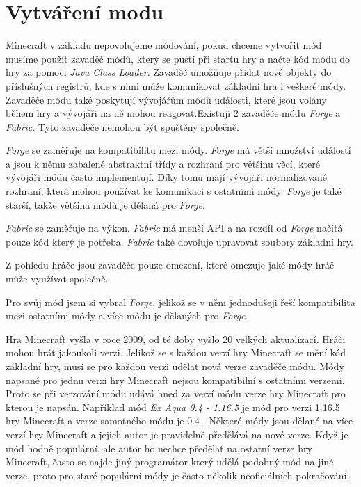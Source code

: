 \documentclass[FM,Proj,bw]{tulthesis}
\begin{document}
\chapter{Vytváření modu}
    Minecraft v základu nepovolujeme módování, pokud chceme vytvořit mód musíme použít zavaděč módů, který se pustí při startu hry a načte kód módu do hry za pomoci \textit{Java Class Loader}. Zavaděč umožňuje přidat nové objekty do příslušných registrů, kde s nimi může komunikovat základní hra i veškeré módy.  Zavaděče módu také poskytují vývojářům módů události, které jsou volány během hry a vývojáři na ně mohou reagovat.Existují 2 zavaděče módu \textit{Forge} a \textit{Fabric}. Tyto zavaděče nemohou být spuštěny společně.\cite{watson2019re}
 \par   \textit{Forge} se zaměřuje na kompatibilitu mezi módy. \textit{Forge} má větší množství událostí a jsou k němu zabalené abstraktní třídy a rozhraní pro většinu věcí, které vývojáři módu často implementují. Díky tomu mají vývojáři normalizované rozhraní, která mohou používat ke komunikaci s ostatními módy. \textit{Forge} je také starší, takže většina módů je dělaná pro \textit{Forge}.
\par  \textit{Fabric} se zaměřuje na výkon. \textit{Fabric} má menší API a na rozdíl od \textit{Forge} načítá pouze kód který je potřeba. \textit{Fabric} také dovoluje upravovat soubory základní hry. 
\par Z pohledu hráče jsou zavaděče pouze omezení, které omezuje jaké módy hráč může využívat společně.
\par Pro svůj mód jsem si vybral \textit{Forge}, jelikož se v něm jednodušeji řeší kompatibilita mezi ostatními módy a více módu je dělaných pro \textit{Forge}.
\par Hra Minecraft vyšla v roce 2009, od té doby vyšlo 20 velkých aktualizací. Hráči mohou hrát jakoukoli verzi. Jelikož se s každou verzí hry Minecraft se mění kód základní hry, musí se pro každou verzi udělat nová verze zavaděče módu. Módy napsané pro jednu verzi hry Minecraft nejsou kompatibilní s ostatními verzemi. Proto se při verzování módu udává hned za verzí módu verze hry Minecraft pro kterou je napsán. Například mód\textit{ Ex Aqua 0.4 - 1.16.5}  je mód pro verzi 1.16.5 hry Minecraft a verze samotného módu je 0.4 . Některé módy jsou dělané na více verzí hry Minecraft a jejich autor je pravidelně předělává na nové verze. Když je mód hodně populární, ale autor ho nechce předělat na ostatní verze hry Minecraft, často se najde jiný programátor který udělá podobný mód na jiné verze, proto pro staré populární módy je často několik neoficiálních pokračování.   
\end{document}
